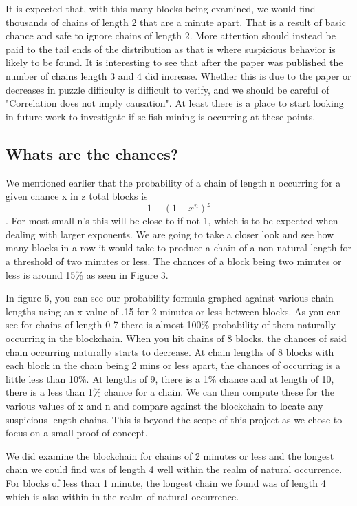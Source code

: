 \documentclass{sig-alternate-05-2015}
\begin{document}
It is expected that, with this many blocks being examined, we would find thousands of chains of length 2 that are a minute apart. That is a result of basic chance and safe to ignore chains of length 2. More attention should instead be paid to the tail ends of the distribution as that is where suspicious behavior is likely to be found. It is interesting to see that after the paper was published the number of chains length 3 and 4 did increase. Whether this is due to the paper or decreases in puzzle difficulty is difficult to verify, and we should be careful of "Correlation does not imply causation". At least there is a place to start looking in future work to investigate if selfish mining is occurring at these points. 

\subsection{Whats are the chances?}
We mentioned earlier that the probability of a chain of length n occurring for a given chance x in z total blocks is \[1-(1-x^n)^{z}\]. For most small n's this will be close to if not 1, which is to be expected when dealing with larger exponents. We are going to take a closer look and see how many blocks in a row it would take to produce a chain of a non-natural length for a threshold of two minutes or less. The chances of a block being two minutes or less is around 15\% as seen in Figure 3. 

In figure 6, you can see our probability formula graphed against various chain lengths using an x value of .15 for 2 minutes or less between blocks. As you can see for chains of length 0-7 there is almost 100\% probability of them naturally occurring in the blockchain. When you hit chains of 8 blocks, the chances of said chain occurring naturally starts to decrease. At chain lengths of 8 blocks with each block in the chain being 2 mins or less apart, the chances of occurring is a little less than 10\%. At lengths of 9, there is a 1\% chance and at length of 10, there is a less than 1\% chance for a chain. We can then compute these for the various values of x and n and compare against the blockchain to locate any suspicious length chains. This is beyond the scope of this project as we chose to focus on a small proof of concept. 

We did examine the blockchain for chains of 2 minutes or less and the longest chain we could find was of length 4 well within the realm of natural occurrence. For blocks of less than 1 minute, the longest chain we found was of length 4 which is also within in the realm of natural occurrence.     
\end{document}
